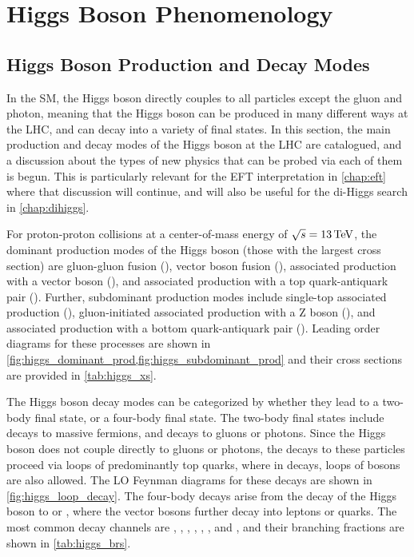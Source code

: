 \section{Higgs Boson Phenomenology}\label{sec:higgs_pheno}

\subsection{Higgs Boson Production and Decay Modes}
In the SM, the Higgs boson directly couples to all particles except the gluon and photon, meaning that the Higgs boson can be produced in many different ways at the LHC, and can decay into a variety of final states. In this section, the main production and decay modes of the Higgs boson at the LHC are catalogued, and a discussion about the types of new physics that can be probed via each of them is begun. This is particularly relevant for the EFT interpretation in \cref{chap:eft} where that discussion will continue, and will also be useful for the di-Higgs search in \cref{chap:dihiggs}.

For proton-proton collisions at a center-of-mass energy of $\sqrt{s}=13\,\text{Te\hspace{-.08em}V}$, the dominant production modes of the Higgs boson (those with the largest cross section) are gluon-gluon fusion (\ggH), vector boson fusion (\VBF), associated production with a vector boson (\VH), and associated production with a top quark-antiquark pair (\ttH). Further, subdominant production modes include single-top associated production (\tH), gluon-initiated associated production with a Z boson (\ggZH), and associated production with a bottom quark-antiquark pair (\bbH). Leading order diagrams for these processes are shown in \cref{fig:higgs_dominant_prod,fig:higgs_subdominant_prod} and their cross sections are provided in \cref{tab:higgs_xs}.

The Higgs boson decay modes can be categorized by whether they lead to a two-body final state, or a four-body final state. The two-body final states include decays to massive fermions, and decays to gluons or photons. Since the Higgs boson does not couple directly to gluons or photons, the decays to these particles proceed via loops of predominantly top quarks, where in \Hgg decays, loops of \PWpm bosons are also allowed. The LO Feynman diagrams for these decays are shown in \cref{fig:higgs_loop_decay}. The four-body decays arise from the decay of the Higgs boson to \WW or \ZZ, where the vector bosons further decay into leptons or quarks. The most common decay channels are \Hbb, \HWW, \Hgluglu, \Htautau, \Hcc, \HZZ, and \Hgg, and their branching fractions are shown in \cref{tab:higgs_brs}. 

